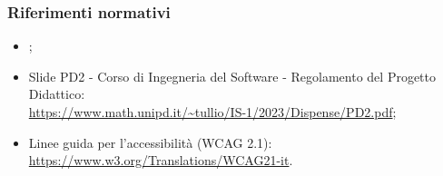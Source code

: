 \subsubsection{Riferimenti normativi}
\begin{itemize}
  \item \NormeDiProgetto;
  \item Slide PD2 - Corso di Ingegneria del Software - Regolamento del Progetto Didattico:\\ \href{https://www.math.unipd.it/~tullio/IS-1/2023/Dispense/PD2.pdf}{https://www.math.unipd.it/\textasciitilde tullio/IS-1/2023/Dispense/PD2.pdf};
  \item Linee guida per l'accessibilità (WCAG 2.1):\\ \href{https://www.w3.org/Translations/WCAG21-it}{https://www.w3.org/Translations/WCAG21-it}.
\end{itemize}

